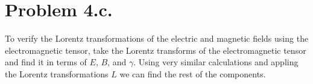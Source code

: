 \documentclass{article}
\begin{document}
\section*{Problem 4.c.}
To verify the Lorentz transformations of the electric and magnetic fields using the electromagnetic tensor, take the Lorentz transforms of the electromagnetic tensor and find it in terms of $E$, $B$, and $\gamma$.
Using very similar calculations and appling the Lorentz transformations $L$ we can find the rest of the components.
\end{document}
